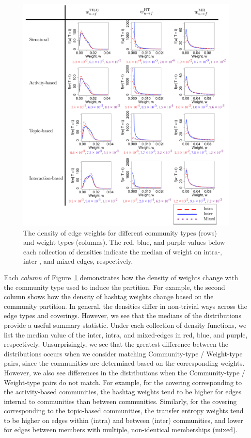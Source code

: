 \begin{figure}[!h]
	\centering
	\includegraphics[width=1\textwidth]{densities-edges}
	\caption{The density of edge weights for different community types (rows) and weight types (columns). The red,  blue, and purple values below each collection of densities indicate the median of weight on intra-, inter-, and mixed-edges, respectively.}
	\label{Fig-distributions_by_types}
\end{figure}

Each \emph{column} of Figure~\ref{Fig-distributions_by_types} demonstrates how the density of weights change with the community type used to induce the partition. For example, the second column shows how the density of hashtag weights change based on the community partition. In general, the densities differ in non-trivial ways across the edge types and coverings. However, we see that the medians of the distributions provide a useful summary statistic. Under each collection of density functions, we list the median value of the inter, intra, and mixed-edges in red, blue, and purple, respectively. Unsurprisingly, we see that the greatest difference between the distributions occurs when we consider matching Community-type / Weight-type pairs, since the communities are determined based on the corresponding weights. However, we also see differences in the distributions when the Community-type / Weight-type pairs do not match. For example, for the covering corresponding to the activity-based communities, the hashtag weights tend to be higher for edges internal to communities than between communities. Similarly, for the covering corresponding to the topic-based communities, the transfer entropy weights tend to be higher on edges within (intra) and between (inter) communities, and lower for edges between members with multiple, non-identical memberships (mixed).


